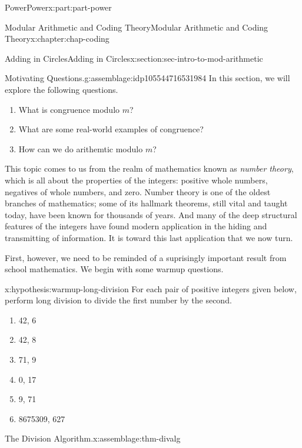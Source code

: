 \documentclass[oneside,10pt,]{book}
\numberwithin{equation}{section}
\begin{document}
\begin{partptx}{Power}{}{Power}{}{}{x:part:part-power}
\typeout{************************************************}
%
\begin{chapterptx}{Modular Arithmetic and Coding Theory}{}{Modular Arithmetic and Coding Theory}{}{}{x:chapter:chap-coding}
%
%
\typeout{************************************************}
\typeout{************************************************}
%
\begin{sectionptx}{Adding in Circles}{}{Adding in Circles}{}{}{x:section:sec-intro-to-mod-arithmetic}
\begin{assemblage}{Motivating Questions.}{g:assemblage:idp105544716531984}%
In this section, we will explore the following questions. %
\begin{enumerate}
\item{}What is congruence modulo \(m\)?%
\item{}What are some real-world examples of congruence?%
\item{}How can we do arithemtic modulo \(m\)?%
\end{enumerate}
%
\end{assemblage}
This topic comes to us from the realm of mathematics known as \emph{number theory}, which is all about the properties of the integers: positive whole numbers, negatives of whole numbers, and zero. Number theory is one of the oldest branches of mathematics; some of its hallmark theorems, still vital and taught today, have been known for thousands of years. And many of the deep structural features of the integers have found modern application in the hiding and transmitting of information. It is toward this last application that we now turn.%
\par
First, however, we need to be reminded of a suprisingly important result from school mathematics. We begin with some warmup questions.%
\begin{hypothesis}{}{}{x:hypothesis:warmup-long-division}%
For each pair of positive integers given below, perform long division to divide the first number by the second.%
%
\begin{enumerate}
\item{}42, 6%
\item{}42, 8%
\item{}71, 9%
\item{}0, 17%
\item{}9, 71%
\item{}8675309, 627%
\end{enumerate}
\end{hypothesis}
\begin{assemblage}{The Division Algorithm.}{x:assemblage:thm-divalg}%

\end{assemblage}
\end{sectionptx}
\end{chapterptx}
\end{partptx}
\end{document}

